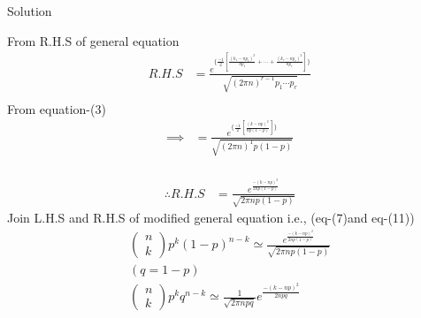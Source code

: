 \documentclass{beamer}
\newcommand{\myvec}[1]{\ensuremath{\begin{pmatrix}#1\end{pmatrix}}}
\begin{document}
\begin{frame}{Solution}
\begin{Large}
From R.H.S of general equation\\
\begin{align}
R.H.S &= \frac{e^{\{\frac{-1}{2}[\frac{(k_{1}-np_{1})^{2}}{np_{1}}+ \cdots +\frac{(k_{r}-np_{r})^{2}}{np_{r}}]\}}}{\sqrt{(2\pi n)^{r-1}p_{1}\cdots p_{r} }}\\
\end{align}
From equation-(3)\\
\begin{align}
\implies &=\frac{e^{\{\frac{-1}{2}[\frac{(k-np)^{2}}{np(1-p)}]\}}}{\sqrt{(2\pi n)^{1}p(1-p)}}\\
\end{align}
\end{Large}
\end{frame}
\begin{frame}
\begin{Large}
\begin{align}
\therefore R.H.S &= \frac{e^{\frac{-(k-np)^{2}}{2np(1-p)}}}{\sqrt{2\pi np(1-p)}}
\end{align}
Join L.H.S and R.H.S of modified general equation i.e., (eq-(7)and eq-(11))\\
\begin{align}
\myvec{n \\ k}p^{k}(1-p)^{n-k} \simeq \frac{e^{\frac{-(k-np)^{2}}{2np(1-p)}}}{\sqrt{2\pi np(1-p)}}\\
(q = 1-p) \\
\myvec{n \\ k}p^{k}q^{n-k}  \simeq \frac{1}{\sqrt{2\pi npq}}e^{\frac{-(k-np)^{2}}{2npq}}
\end{align}
\end{Large}
\end{frame}
\end{document}
